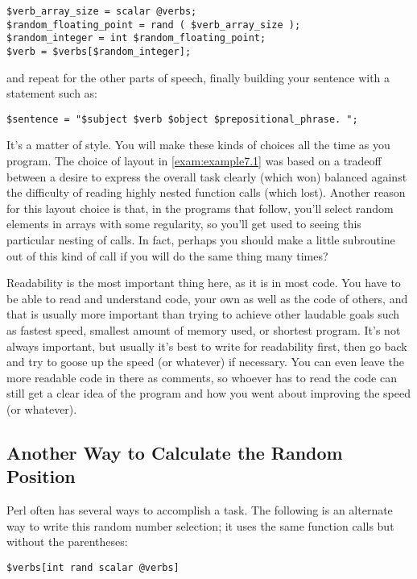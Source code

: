 \begin{lstlisting}
$verb_array_size = scalar @verbs;
$random_floating_point = rand ( $verb_array_size );
$random_integer = int $random_floating_point;
$verb = $verbs[$random_integer];
\end{lstlisting}

and repeat for the other parts of speech, finally building your sentence with a statement such as:

\begin{lstlisting}
$sentence = "$subject $verb $object $prepositional_phrase. ";
\end{lstlisting}

It's a matter of style. You will make these kinds of choices all the time as you program. The choice of layout in \autoref{exam:example7.1} was based on a tradeoff between a desire to express the overall task clearly (which won) balanced against the difficulty of reading highly nested function calls (which lost). Another reason for this layout choice is that, in the programs that follow, you'll select random elements in arrays with some regularity, so you'll get used to seeing this particular nesting of calls. In fact, perhaps you should make a little subroutine out of this kind of call if you will do the same thing many times?

Readability is the most important thing here, as it is in most code. You have to be able to read and understand code, your own as well as the code of others, and that is usually more important than trying to achieve other laudable goals such as fastest speed, smallest amount of memory used, or shortest program. It's not always important, but usually it's best to write for readability first, then go back and try to goose up the speed (or whatever) if necessary. You can even leave the more readable code in there as comments, so whoever has to read the code can still get a clear idea of the program and how you went about improving the speed (or whatever). 

\subsection{Another Way to Calculate the Random Position}
Perl often has several ways to accomplish a task. The following is an alternate way to write this random number selection; it uses the same function calls but without the parentheses:

\begin{lstlisting}
$verbs[int rand scalar @verbs]
\end{lstlisting}

